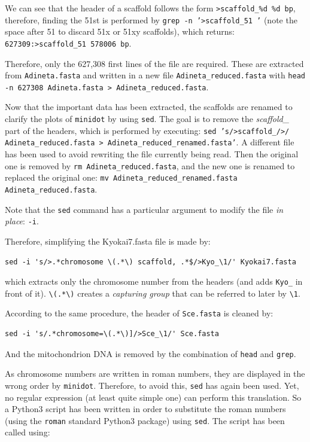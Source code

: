 \documentclass{article}
\begin{document}
We can see that the header of a scaffold follows the form \texttt{>scaffold\_\%d \%d bp}, therefore, finding
the 51st is performed by \texttt{grep -n '>scaffold\_51 '} (note the space after 51 to discard 51x or 51xy
scaffolds), which returns: \texttt{627309:>scaffold\_51 578006 bp}.

Therefore, only the 627,308 first lines of the file are required. These are extracted from \texttt{Adineta.fasta}
and written in a new file \texttt{Adineta\_reduced.fasta} with \texttt{head -n 627308 Adineta.fasta > Adineta\_reduced.fasta}.

Now that the important data has been extracted, the scaffolds are renamed to clarify the plots of \texttt{minidot} by
using \texttt{sed}. The goal is to remove the \textit{scaffold\_} part of the headers, which is performed by executing:
\texttt{sed 's/>scaffold\_/>/ Adineta\_reduced.fasta > Adineta\_reduced\_renamed.fasta'}. A different file has been used
to avoid rewriting the file currently being read. Then the original one is removed by \texttt{rm Adineta\_reduced.fasta},
and the new one is renamed to replaced the original one: \texttt{mv Adineta\_reduced\_renamed.fasta Adineta\_reduced.fasta}.

Note that the \texttt{sed} command has a particular argument to modify the file \textit{in place}: \texttt{-i}.

Therefore, simplifying the Kyokai7.fasta file is made by:
\begin{verbatim}sed -i 's/>.*chromosome \(.*\) scaffold, .*$/>Kyo_\1/' Kyokai7.fasta\end{verbatim}
which extracts only the chromosome number from the headers (and adds \texttt{Kyo\_} in front of it). \verb+\(.*\)+
creates a \textit{capturing group} that can be referred to later by \verb+\1+.

According to the same procedure, the header of \texttt{Sce.fasta} is cleaned by:
\begin{verbatim}sed -i 's/.*chromosome=\(.*\)]/>Sce_\1/' Sce.fasta\end{verbatim}

And the mitochondrion DNA is removed by the combination of \texttt{head} and \texttt{grep}.

As chromosome numbers are written in roman numbers, they are displayed in the wrong order by \texttt{minidot}.
Therefore, to avoid this, \texttt{sed} has again been used. Yet, no regular expression (at least quite simple one)
can perform this translation. So a Python3 script has been written in order to substitute the roman numbers
(using the \texttt{roman} standard Python3 package) using \texttt{sed}. The script has been called using:
\end{document}
